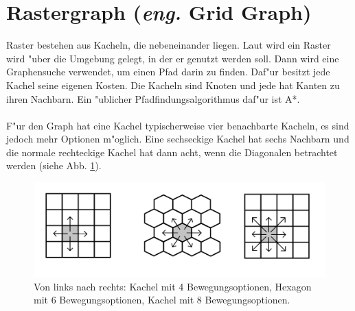 \section{Rastergraph (\textit{eng.} Grid Graph)}
Raster bestehen aus Kacheln, die nebeneinander liegen. Laut \cite{Grid:02} wird ein Raster wird "uber die Umgebung gelegt, in der er genutzt werden soll. Dann wird eine Graphensuche verwendet, um einen Pfad darin zu finden. Daf"ur besitzt jede Kachel seine eigenen Kosten. Die Kacheln sind Knoten und jede hat Kanten zu ihren Nachbarn. Ein "ublicher Pfadfindungsalgorithmus daf"ur ist A*.
\\\\
F"ur den Graph hat eine Kachel typischerweise vier benachbarte Kacheln, es sind jedoch mehr Optionen m"oglich. Eine sechseckige Kachel hat sechs Nachbarn und die normale rechteckige Kachel hat dann acht, wenn die Diagonalen betrachtet werden (siehe Abb. \ref{sec2a}).
\begin{figure} %
	\centering
	\includegraphics[width=\textwidth]{images/Grid_Tiles.png}
	\caption{Von links nach rechts: Kachel mit 4 Bewegungsoptionen, Hexagon mit 6 Bewegungsoptionen, Kachel mit 8 Bewegungsoptionen.}
	\label{sec2a}
\end{figure}


